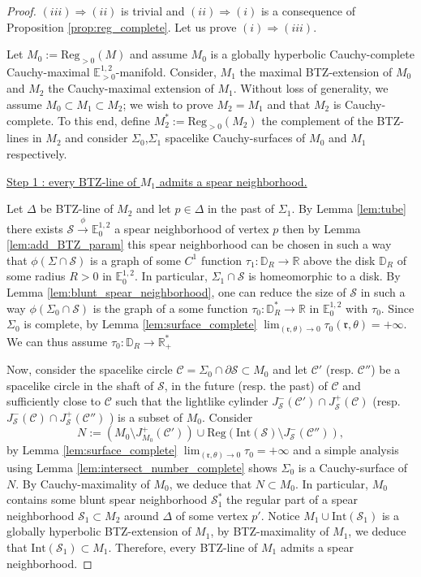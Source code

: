 \documentclass[a4paper,12pt]{article}
\def\r{\mathfrak{r}}
\def\C{\mathcal C}
\def\S{\mathcal S}
\def\S{\mathcal{S}}
\def\RR{\mathbb{R}}
\newcommand{\mass}[1]{{\mathbb E}^{1,2}_{#1}}
\def\Reg{\mathrm{Reg}}
\def\reg{\Reg}
\begin{document}
				
				\begin{proof}
				  $(iii)\Rightarrow (ii)$  is trivial and $(ii)\Rightarrow (i)$ is a consequence of Proposition \ref{prop:reg_complete}.  Let us prove $(i)\Rightarrow (iii)$.
				  
				  Let $M_0:=\reg_{>0}(M)$ and assume $M_0$ is a globally hyperbolic Cauchy-complete Cauchy-maximal $\mass{>0}$-manifold.
				  Consider, $M_1$ the maximal BTZ-extension of $M_0$ and $M_2$ the Cauchy-maximal extension of $M_1$. Without loss of generality, we assume $M_0\subset M_1\subset M_2$; we wish to prove $M_2=M_1$ and that $M_2$ is Cauchy-complete. To this end, define $M_2^* := \reg_{>0}(M_2)$ the complement of the BTZ-lines in $M_2$ and consider $\Sigma_0$,$\Sigma_1$ spacelike Cauchy-surfaces of $M_0$ and $M_1$ respectively.  
				  
				  \item \underline{Step 1 : every BTZ-line of $M_1$ admits a spear neighborhood.}
				  
				  Let $\Delta$ be BTZ-line of $M_2$ and let $p\in \Delta$ in the past of $\Sigma_1$. By Lemma \ref{lem:tube} there exists $\S\xrightarrow{\phi} \mass{0}$ a spear neighborhood of vertex $p$ then 
				  by Lemma \ref{lem:add_BTZ_param} this spear neighborhood can be chosen in such a way that $\phi(\Sigma \cap \S)$ is a graph of some $C^1$ function $\tau_1:\mathbb D_R\rightarrow \RR$ above the disk $\mathbb D_R$ of some radius $R>0$ in $\mass{0}$. In particular, $\Sigma_1\cap \S$ is homeomorphic to a disk. By Lemma \ref{lem:blunt_spear_neighborhood}, one can reduce the size of $\S$ in such a way $\phi(\Sigma_0\cap \S)$ is the graph of a some function $\tau_0:\mathbb D_R^*\rightarrow \RR$ in $\mass{0}$ with $\tau_0$. Since $\Sigma_0$ is complete, by Lemma \ref{lem:surface_complete} $ \lim_{(\r,\theta)\rightarrow 0}\tau_0(\r,\theta) = +\infty$. We can thus assume $\tau_0: \mathbb D_R\rightarrow \RR_+^*$
				  
				  Now, consider the spacelike circle $\C=\Sigma_0\cap \partial \S\subset M_0$ and let $\C'$ (resp. $\C''$) be a spacelike circle in the shaft of $\S$, in the future (resp. the past) of $\C$  and sufficiently close to $\C$ such that the lightlike cylinder $J^-_{\S}(\C')\cap J^+_{\S}(\C)$ (resp. $J^-_{\S}(\C)\cap J^+_{\S}(\C'')$ ) is a subset of $M_0$. Consider $$N:= (M_0\setminus J^+_{M_0}(\C'))\cup \reg(\mathrm{Int}(\S) \setminus J^-_\S(\C'')),$$ 
				  by Lemma \ref{lem:surface_complete} $\lim_{(\r,\theta)\rightarrow 0}\tau_0=+\infty$ and a simple analysis using Lemma \ref{lem:intersect_number_complete} shows $\Sigma_0$ is a Cauchy-surface of $N$. By Cauchy-maximality of $M_0$, we deduce that $N\subset M_0$.  In particular, $M_0$ contains some blunt spear neighborhood $\S_1^*$ the regular part of a spear neighborhood $\S_1\subset M_2$ around $\Delta$ of some vertex $p'$. Notice $M_1\cup \mathrm{Int}(\S_1)$ is a globally hyperbolic BTZ-extension of $M_1$, by BTZ-maximality of $M_1$, we deduce that $\mathrm{Int}(\S_1)\subset M_1$. Therefore, every BTZ-line of $M_1$ admits a spear neighborhood.
				  

\end{proof}
\end{document}
